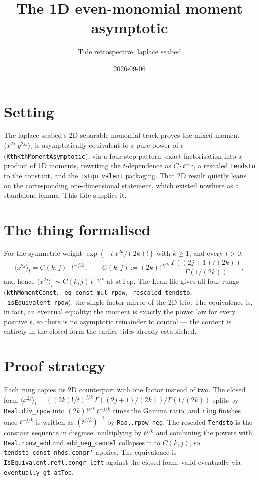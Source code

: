\documentclass[11pt]{article}
\title{The 1D even-monomial moment asymptotic}
\author{Tide retrospective, laplace seabed}
\date{2026-09-06}
\begin{document}
\sloppy
\maketitle
\section{Setting}
The laplace seabed's 2D separable-monomial track proves the mixed moment
$\langle x^{2j_1} y^{2j_2}\rangle_t$ is asymptotically equivalent to a pure power of $t$
(\texttt{KthKthMomentAsymptotic}), via a four-step pattern: exact factorisation into a product of
1D moments, rewriting the $t$-dependence as $C\cdot t^{-\ldots}$, a rescaled \texttt{Tendsto} to the
constant, and the \texttt{IsEquivalent} packaging. That 2D result quietly leans on the corresponding
one-dimensional statement, which existed nowhere as a standalone lemma. This tide supplies it.
\section{The thing formalised}
For the symmetric weight $\exp(-t\,x^{2k}/(2k)!)$ with $k\ge 1$, and every $t>0$,
\[
  \langle x^{2j}\rangle_t = C(k,j)\cdot t^{-j/k},\qquad
  C(k,j) := (2k)!^{\,j/k}\,\frac{\Gamma((2j+1)/(2k))}{\Gamma(1/(2k))},
\]
and hence $\langle x^{2j}\rangle_t \sim C(k,j)\,t^{-j/k}$ at $\mathrm{atTop}$. The Lean file gives
all four rungs (\texttt{kthMomentConst}, \texttt{\_eq\_const\_mul\_rpow},
\texttt{\_rescaled\_tendsto}, \texttt{\_isEquivalent\_rpow}), the single-factor mirror of the 2D
trio. The equivalence is, in fact, an eventual equality: the moment is exactly the power law for
every positive $t$, so there is no asymptotic remainder to control --- the content is entirely in the
closed form the earlier tides already established.
\section{Proof strategy}
Each rung copies its 2D counterpart with one factor instead of two. The closed form
$\langle x^{2j}\rangle_t = ((2k)!/t)^{j/k}\,\Gamma((2j+1)/(2k))/\Gamma(1/(2k))$
splits by \texttt{Real.div\_rpow} into $(2k)!^{j/k}\,t^{-j/k}$ times the Gamma ratio, and
\texttt{ring} finishes once $t^{-j/k}$ is written as $(t^{j/k})^{-1}$ by \texttt{Real.rpow\_neg}. The
rescaled \texttt{Tendsto} is the constant sequence in disguise: multiplying by $t^{j/k}$ and
combining the powers with \texttt{Real.rpow\_add} and \texttt{add\_neg\_cancel} collapses it to
$C(k,j)$, so \texttt{tendsto\_const\_nhds.congr'} applies. The equivalence is
\texttt{IsEquivalent.refl.congr\_left} against the closed form, valid eventually via
\texttt{eventually\_gt\_atTop}.
\end{document}
